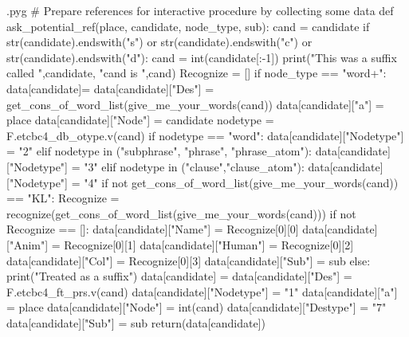 \documentclass{report}
\makeatletter
\newenvironment{python}{%
  \VerbatimEnvironment
  \minted@resetoptions
  \setkeys{minted@opt}{}
      \begin{VerbatimOut}{\jobname.pyg}}
{%
      \end{VerbatimOut}
      \minted@pygmentize{python}
      \DeleteFile{\jobname.pyg}}
\makeatother
\begin{document}
\begin{python}
# Prepare references for interactive procedure by collecting some data
def ask_potential_ref(place, candidate, node_type, sub):
    cand = candidate
    if str(candidate).endswith("s") or str(candidate).endswith("c") or str(candidate).endswith("d"):
        cand = int(candidate[:-1])
        print("This was a suffix called ",candidate, "cand is ",cand)
    Recognize = []
    if node_type == "word+": 
        data[candidate]= {}
        data[candidate]["Des"] = get_cons_of_word_list(give_me_your_words(cand))
        data[candidate]["a"] = place
        data[candidate]["Node"] = candidate
        nodetype = F.etcbc4_db_otype.v(cand)
        if nodetype == "word":
            data[candidate]["Nodetype"] = "2"
        elif nodetype in ("subphrase", "phrase", "phrase_atom"):
            data[candidate]["Nodetype"] = "3"
        elif nodetype in ("clause","clause_atom"):
            data[candidate]["Nodetype"] = "4"
        if not get_cons_of_word_list(give_me_your_words(cand)) == "KL":
            Recognize = recognize(get_cons_of_word_list(give_me_your_words(cand)))
        if not Recognize == []:
            data[candidate]["Name"] = Recognize[0][0]
            data[candidate]["Anim"] = Recognize[0][1]
            data[candidate]["Human"] = Recognize[0][2]
            data[candidate]["Col"] = Recognize[0][3]
        data[candidate]["Sub"] = sub
    else:
        print("Treated as a suffix")
        data[candidate] = {}
        data[candidate]["Des"] = F.etcbc4_ft_prs.v(cand)
        data[candidate]["Nodetype"] = "1"
        data[candidate]["a"] = place
        data[candidate]["Node"] = int(cand)
        data[candidate]["Destype"] = "7"
        data[candidate]["Sub"] = sub
    return(data[candidate])

\end{python}
\end{document}
